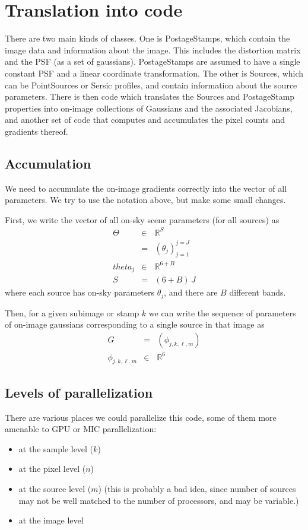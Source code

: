 \documentclass[modern]{aastex6}
\begin{document}
\section{Translation into code}
There are two main kinds of classes.
One is PostageStamps, which contain the image data and information about the image.
This includes the distortion matrix and the PSF (as a set of gaussians).
PostageStamps are assumed to have a single constant PSF and a linear coordinate transformation.
 The other is Sources, which can be PointSources or Sersic profiles, and contain information about the source parameters.
There is then code which translates the Sources and PostageStamp properties into on-image collections of Gaussians and the associated Jacobians, 
and another set of code that computes and accumulates the pixel counts and gradients thereof.



\subsection{Accumulation}
We need to accumulate the on-image gradients correctly into the vector of all parameters. 
We try to use the notation above, but make some small changes.

First, we write the vector of all on-sky scene parameters (for all sources) as 
\begin{eqnarray}
\Theta & \in & \mathbb{R}^{S} \\
 & = & (\theta_j)_{j=1}^{j=J} \\
theta_j & \in & \mathbb{R}^{6+B} \\
S & = & (6 + B) \, J
\end{eqnarray}
where each source has on-sky parameters $\theta_j$, and there are $B$ different bands.

Then, for a given subimage or stamp $k$ we can write the sequence of parameters of on-image gaussians corresponding to a single source in that image as 
\begin{eqnarray}
G & = & (\phi_{j, k, \ell, m}) \\
\phi_{j, k, \ell, m} & \in & \mathbb{R}^{6}
\end{eqnarray}


\subsection{Levels of parallelization}
There are various places we could parallelize this code, 
some of them more amenable to GPU or MIC parallelization:
\begin{itemize}

\item at the sample level ($k$)

\item at the pixel level ($n$)

\item at the source level ($m$) (this is probably a bad idea, since number of sources may not be well matched to the number of processors, and may be variable.)

\item at the image level
\end{itemize}
\end{document}
